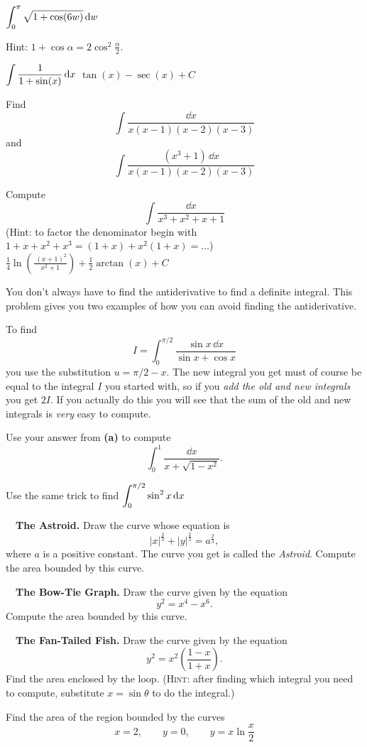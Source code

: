 \begin{multicols}{2}
\problem \(\displaystyle \int_0^\pi\sqrt{1 + \cos(6w)} \, \mathrm{d} w \) %

Hint: $1+\cos \alpha = 2\cos^2\frac{\alpha}{2}$.

\problem \(\displaystyle \int \frac{1}{1 + \sin(x)} \, \mathrm{d} x \) %
\answer %
$\tan(x)-\sec(x)+C$
\endanswer

\problem Find %
\[
\int \frac{\dd x}{x(x-1)(x-2)(x-3)}
\]
and
\[
\int \frac{(x^3+1) \,\dd x}{x(x-1)(x-2)(x-3)}
\]

\problem Compute %
\[
\int \frac{\dd x}{x^3+x^2+x+1}
\]
(Hint: to factor the denominator begin with $1+x+x^2+x^3 = (1+x) + x^2(1+x) = 
\ldots$)
\answer %
$\frac14\ln(\frac{\;(x+1)^2}{x^2+1})+\frac12\arctan(x)+C$
\endanswer


\problem \groupproblem  You don't always have to find the %
antiderivative to find a definite integral. This problem gives you two
examples of how you can avoid finding the antiderivative.

\subprob To find
\[
I=\int^{\pi /2}_0 \frac{\sin x\,\dd x}{\sin x+\cos x}
\]
you use the substitution $u=\pi /2-x$. The new integral you get must
of course be equal to the integral $I$ you started with, so if you
\textit{add the old and new integrals} you get $2I$. If you actually
do this you will see that the sum of the old and new integrals is
\textit{very} easy to compute.

\subprob Use your answer from {\bfseries(a)} to compute
\[
\int_0^1 \frac{\dd x}{x+\sqrt{1-x^2}}.
\]

\subprob Use the same trick to find $\displaystyle \int_0^{\pi/2} \sin^2 x\,\mathrm{d}
x$

\problem  \carefulnow\ \  \textbf{The Astroid. } Draw the curve whose equation is %
\[
|x|^{\frac 23} + |y|^{\frac 23}=a^{\frac 23},
\]
where $a$ is a positive constant.  The curve you get is called the \emph{Astroid}.
Compute the area bounded by this curve.

\problem \carefulnow\ \ \textbf{The Bow-Tie Graph. } Draw the curve given by the %
equation
\[
y^2=x^4-x^6.
\]
Compute the area bounded by this curve.

\problem \carefulnow\ \ \textbf{The Fan-Tailed Fish. } Draw the curve given by %
the equation
\[
y^2=x^2\left( \frac{1-x}{1+x}\right).
\]
Find the area enclosed by the loop.
(\textsc{Hint}: after finding which integral you need to compute, substitute
$x=\sin\theta$ to do the integral.)

\problem %
Find the area of the region bounded by the curves
\[
x = 2,\qquad  y = 0,\qquad y =  x\ln\frac x2
\]


\end{multicols}
